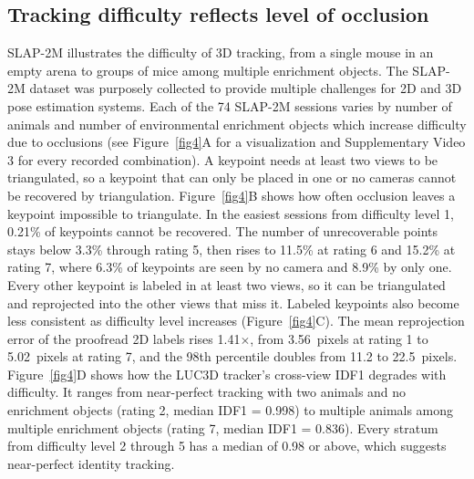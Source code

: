 \documentclass[pdflatex, sn-nature]{sn-jnl}
\theoremstyle{thmstyleone}%
\theoremstyle{thmstyletwo}%
\theoremstyle{thmstylethree}%
\begin{document}
\subsection{Tracking difficulty reflects level of occlusion}\label{subsec2-6}

SLAP-2M illustrates the difficulty of 3D tracking, from a single mouse in an empty arena to groups of mice among multiple enrichment objects. The SLAP-2M dataset was purposely collected to provide multiple challenges for 2D and 3D pose estimation systems. Each of the 74 SLAP-2M sessions varies by number of animals and number of environmental enrichment objects which increase difficulty due to occlusions (see Figure~\ref{fig4}A for a visualization and Supplementary Video 3 for every recorded combination). A keypoint needs at least two views to be triangulated, so a keypoint that can only be placed in one or no cameras cannot be recovered by triangulation. Figure~\ref{fig4}B shows how often occlusion leaves a keypoint impossible to triangulate. In the easiest sessions from difficulty level 1, 0.21\% of keypoints cannot be recovered. The number of unrecoverable points stays below 3.3\% through rating 5, then rises to 11.5\% at rating 6 and 15.2\% at rating 7, where 6.3\% of keypoints are seen by no camera and 8.9\% by only one. Every other keypoint is labeled in at least two views, so it can be triangulated and reprojected into the other views that miss it. Labeled keypoints also become less consistent as difficulty level increases (Figure~\ref{fig4}C). The mean reprojection error of the proofread 2D labels rises 1.41$\times$, from 3.56~pixels at rating 1 to 5.02~pixels at rating 7, and the 98th percentile doubles from 11.2 to 22.5~pixels. Figure~\ref{fig4}D shows how the LUC3D tracker's cross-view IDF1 degrades with difficulty. It ranges from near-perfect tracking with two animals and no enrichment objects (rating 2, median IDF1 = 0.998) to multiple animals among multiple enrichment objects (rating 7, median IDF1 = 0.836). Every stratum from difficulty level 2 through 5 has a median of 0.98 or above, which suggests near-perfect identity tracking.
\end{document}
